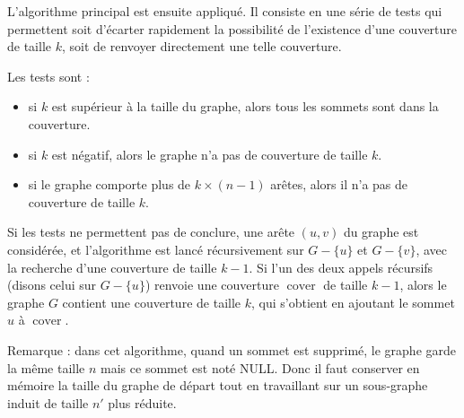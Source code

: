 \documentclass[a4paper,10pt]{article}
\DeclareMathOperator{\cover}{cover}
\begin{document}
L'algorithme principal est ensuite appliqué. Il consiste en une série de tests qui permettent soit d'écarter rapidement la possibilité de l'existence d'une couverture de taille $k$, soit de renvoyer directement une telle couverture. 

Les tests sont : 
\begin{itemize}
\item si $k$ est supérieur à la taille du graphe, alors tous les sommets sont dans la couverture.
\item si $k$ est négatif, alors le graphe n'a pas de couverture de taille $k$.
\item si le graphe comporte plus de $k\times(n-1)$ arêtes, alors il n'a pas de couverture de taille $k$.
\end{itemize}

\bigskip

Si les tests ne permettent pas de conclure, une arête $(u,v)$ du graphe est considérée, et l'algorithme est lancé récursivement sur $G - \{u\}$ et $G - \{v\}$, avec la recherche d'une couverture de taille $k-1$. Si l'un des deux appels récursifs (disons celui sur $G - \{u\}$) renvoie une couverture $\cover$ de taille $k-1$, alors le graphe $G$ contient une couverture de taille $k$, qui s'obtient en ajoutant le sommet $u$ à $\cover$.

Remarque : dans cet algorithme, quand un sommet est supprimé, le graphe garde la même taille $n$ mais ce sommet est noté \og NULL\fg. Donc il faut conserver en mémoire la taille du graphe de départ tout en travaillant sur un sous-graphe induit de taille $n'$ plus réduite.
\end{document}
